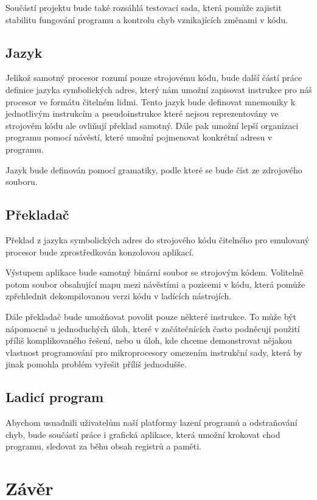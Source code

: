 Součástí projektu bude také rozsáhlá testovací sada, která pomůže zajistit stabilitu fungování programu a kontrolu chyb vznikajících změnami v kódu. 

\subsection{Jazyk}

Jelikož samotný procesor rozumí pouze strojovému kódu, bude další částí práce definice jazyka symbolických adres, který nám umožní zapisovat instrukce pro náš procesor ve formátu čitelném lidmi. Tento jazyk bude definovat mnemoniky k jednotlivým instrukcím a pseudoinstrukce které nejsou reprezentovány ve strojovém kódu ale ovliňují překlad samotný. Dále pak umožní lepší organizaci programu pomocí návěstí, které umožní pojmenovat konkrétní adresu v programu.

Jazyk bude definován pomocí gramatiky, podle které se bude číst ze zdrojového souboru.

\subsection{Překladač}

Překlad z jazyka symbolických adres do strojového kódu čitelného pro emulovaný procesor bude zprostředkován konzolovou aplikací.

Výstupem aplikace bude samotný binární soubor se strojovým kódem. Volitelně potom soubor obsahující mapu mezi návěstími a pozicemi v kódu, která pomůže zpřehlednit dekompilovanou verzi kódu v ladících nástrojích.

Dále překladač bude umožňovat povolit pouze některé instrukce. To může být nápomocné u jednoduchých úloh, které v začátečnících často podněcují použití příliš komplikovaného řešení, nebo u úloh, kde chceme demonstrovat nějakou vlastnost programování pro mikroprocesory omezením instrukční sady, která by jinak pomohla problém vyřešit příliš jednodušše.

\subsection{Ladicí program}

Abychom usnadnili uživatelům naší platformy lazení programů a odstraňování chyb, bude součástí práce i grafická aplikace, která umožní krokovat chod programu, sledovat za běhu obsah registrů a paměti.

\section{Závěr}

\blind[1]